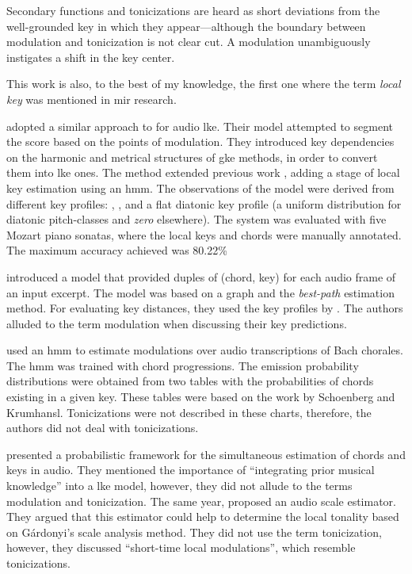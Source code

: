 \begin{italicquotes}
    Secondary functions and tonicizations are heard as short
    deviations from the well-grounded key in which they
    appear---although the boundary between modulation and
    tonicization is not clear cut. A modulation
    unambiguously instigates a shift in the key center.
\end{italicquotes}

This work is also, to the best of my knowledge, the first
one where the term \emph{local key} was mentioned in
\gls{mir} research.

\textcite{papadopoulos2009local} adopted a similar approach
to \textcite{izmirli2007localized} for audio \gls{lke}.
Their model attempted to segment the score based on the
points of modulation. They introduced key dependencies on
the harmonic and metrical structures of \gls{gke} methods,
in order to convert them into \gls{lke} ones. The method
extended previous work
\parencite{papadopoulos2008simultaneous}, adding a stage of
local key estimation using an \gls{hmm}. The observations of
the model were derived from different key profiles:
\textcite{krumhansl1982tracing},
\textcite{temperley1999whats}, and a flat diatonic key
profile (a uniform distribution for diatonic pitch-classes
and \emph{zero} elsewhere). The system was evaluated with
five Mozart piano sonatas, where the local keys and chords
were manually annotated. The maximum accuracy achieved was
80.22\%

\textcite{rocher2010concurrent} introduced a model that
provided duples of (chord, key) for each audio frame of an
input excerpt. The model was based on a graph and the
\emph{best-path} estimation method. For evaluating key
distances, they used the key profiles by
\textcite{temperley1999whats}. The authors alluded to the
term modulation when discussing their key predictions.

\textcite{mearns2011automatically} used an \gls{hmm} to
estimate modulations over audio transcriptions of Bach
chorales. The \gls{hmm} was trained with chord progressions.
The emission probability distributions were obtained from
two tables with the probabilities of chords existing in a
given key. These tables were based on the work by Schoenberg
and Krumhansl. Tonicizations were not described in these
charts, therefore, the authors did not deal with
tonicizations.


\textcite{pauwels2014combining} presented a probabilistic
framework for the simultaneous estimation of chords and keys
in audio. They mentioned the importance of ``integrating
prior musical knowledge'' into a \gls{lke} model, however,
they did not allude to the terms modulation and
tonicization. The same year, \textcite{weis2014chromabased}
proposed an audio scale estimator. They argued that this
estimator could help to determine the local tonality based
on G\'{a}rdonyi's scale analysis method. They did not use
the term tonicization, however, they discussed ``short-time
local modulations'', which resemble tonicizations.


